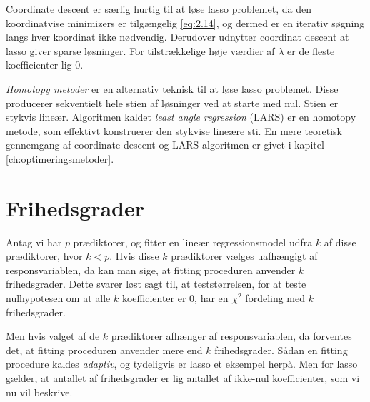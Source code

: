 
Coordinate descent er særlig hurtig til at løse lasso problemet, da den koordinatvise minimizers er tilgængelig \eqref{eq:2.14}, og dermed er en iterativ søgning langs hver koordinat ikke nødvendig.
Derudover udnytter coordinat descent at lasso giver sparse løsninger.
For tilstrækkelige høje værdier af \(\lambda\) er de fleste koefficienter lig $0$.

\textit{Homotopy metoder} er en alternativ teknisk til at løse lasso problemet. 
Disse producerer sekventielt hele stien af løsninger ved at starte med nul.
Stien er stykvis lineær.
Algoritmen kaldet \textit{least angle regression} (LARS) er en homotopy metode, som effektivt konstruerer den stykvise lineære sti.
En mere teoretisk gennemgang af coordinate descent og LARS algoritmen er givet i kapitel \ref{ch:optimeringsmetoder}.
%
\section{Frihedsgrader}
Antag vi har \(p\) prædiktorer, og fitter en lineær regressionsmodel udfra \(k\) af disse prædiktorer, hvor \(k <p\).
Hvis disse \(k\) prædiktorer vælges uafhængigt af responsvariablen, da kan man sige, at fitting proceduren anvender \(k\) frihedsgrader.
Dette svarer løst sagt til, at teststørrelsen, for at teste nulhypotesen om at alle \(k\) koefficienter er 0, har en \(\chi^2\) fordeling med \(k\) frihedsgrader.

Men hvis valget af de \(k\) prædiktorer afhænger af responsvariablen, da forventes det, at fitting proceduren anvender mere end \(k\) frihedsgrader. 
Sådan en fitting procedure kaldes \textit{adaptiv}, og tydeligvis er lasso et eksempel herpå.
Men for lasso gælder, at antallet af frihedsgrader er lig antallet af ikke-nul koefficienter, som vi nu vil beskrive.

